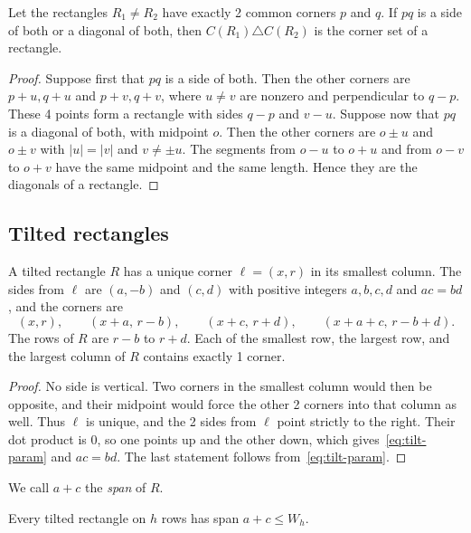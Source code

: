 \begin{lemma}\label{lem:compress}
Let the rectangles $R_1\ne R_2$ have exactly 2 common corners $p$ and $q$. If $pq$ is a
side of both or a diagonal of both, then $C(R_1)\triangle C(R_2)$ is the corner set of a
rectangle.
\end{lemma}

\begin{proof}
Suppose first that $pq$ is a side of both. Then the other corners are $p+u,q+u$ and
$p+v,q+v$, where $u\ne v$ are nonzero and perpendicular to $q-p$. These 4 points form a
rectangle with sides $q-p$ and $v-u$. Suppose now that $pq$ is a diagonal of both, with
midpoint $o$. Then the other corners are $o\pm u$ and $o\pm v$ with $|u|=|v|$ and
$v\ne\pm u$. The segments from $o-u$ to $o+u$ and from $o-v$ to $o+v$ have the same
midpoint and the same length. Hence they are the diagonals of a rectangle.
\end{proof}

\subsection{Tilted rectangles}

\begin{lemma}\label{lem:leftmost}
A tilted rectangle $R$ has a unique corner $\ell=(x,r)$ in its smallest column. The sides
from $\ell$ are $(a,-b)$ and $(c,d)$ with positive integers $a,b,c,d$ and $ac=bd$, and
the corners are
\begin{equation}\label{eq:tilt-param}
(x,r),\qquad(x+a,\,r-b),\qquad(x+c,\,r+d),\qquad(x+a+c,\,r-b+d).
\end{equation}
The rows of $R$ are $r-b$ to $r+d$. Each of the smallest row, the largest row, and the
largest column of $R$ contains exactly 1 corner.
\end{lemma}

\begin{proof}
No side is vertical. Two corners in the smallest column would then be opposite, and their
midpoint would force the other 2 corners into that column as well. Thus $\ell$ is unique,
and the 2 sides from $\ell$ point strictly to the right. Their dot product is $0$, so one
points up and the other down, which gives~\eqref{eq:tilt-param} and $ac=bd$. The last
statement follows from~\eqref{eq:tilt-param}.
\end{proof}

We call $a+c$ the \emph{span} of $R$.

\begin{lemma}\label{lem:span}
Every tilted rectangle on $h$ rows has span $a+c\le W_h$.
\end{lemma}

